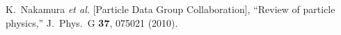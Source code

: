 \documentclass[aps,prc,preprint,superscriptaddress,showpacs,showkeys,amsmath]{revtex4-1}
\begin{document}
\begin{thebibliography}{100}
 
 

  K.~Nakamura {\it et al.}  [Particle Data Group Collaboration],
  ``Review of particle physics,''
  J.\ Phys.\ G {\bf 37}, 075021 (2010).



\end{thebibliography}
\end{document}
